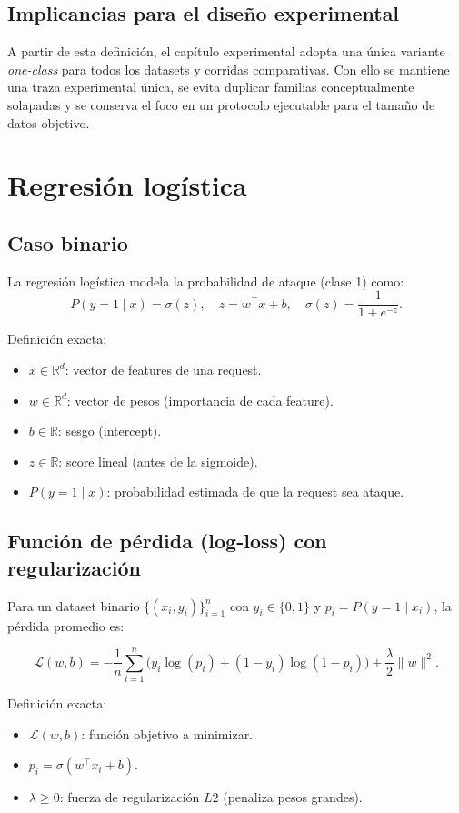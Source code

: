 \documentclass[12pt,oneside]{report}
\newcommand{\R}{\mathbb{R}}
\newcommand{\sigmoid}{\sigma}
\begin{document}
\subsection{Implicancias para el diseño experimental}
A partir de esta definición, el capítulo experimental adopta una única variante \textit{one-class} para todos los datasets y corridas comparativas. Con ello se mantiene una traza experimental única, se evita duplicar familias conceptualmente solapadas y se conserva el foco en un protocolo ejecutable para el tamaño de datos objetivo.

\section{Regresión logística}
\subsection{Caso binario}
La regresión logística modela la probabilidad de ataque (clase 1) como:
\[
P(y=1\mid x)=\sigmoid(z), \quad z=w^\top x + b, \quad \sigmoid(z)=\frac{1}{1+e^{-z}}.
\]

Definición exacta:
\begin{itemize}[leftmargin=*]
  \item $x \in \R^d$: vector de features de una request.
  \item $w \in \R^d$: vector de pesos (importancia de cada feature).
  \item $b \in \R$: sesgo (intercept).
  \item $z \in \R$: score lineal (antes de la sigmoide).
  \item $P(y=1\mid x)$: probabilidad estimada de que la request sea ataque.
\end{itemize}

\subsection{Función de pérdida (log-loss) con regularización}
Para un dataset binario $\{(x_i,y_i)\}_{i=1}^n$ con $y_i\in\{0,1\}$ y $p_i=P(y=1\mid x_i)$, la pérdida promedio es:

\[
\mathcal{L}(w,b)= -\frac{1}{n}\sum_{i=1}^n \Big(y_i\log(p_i) + (1-y_i)\log(1-p_i)\Big) + \frac{\lambda}{2}\lVert w\rVert^2.
\]

Definición exacta:
\begin{itemize}[leftmargin=*]
  \item $\mathcal{L}(w,b)$: función objetivo a minimizar.
  \item $p_i=\sigmoid(w^\top x_i + b)$.
  \item $\lambda \ge 0$: fuerza de regularización $L2$ (penaliza pesos grandes).
\end{itemize}
\end{document}
